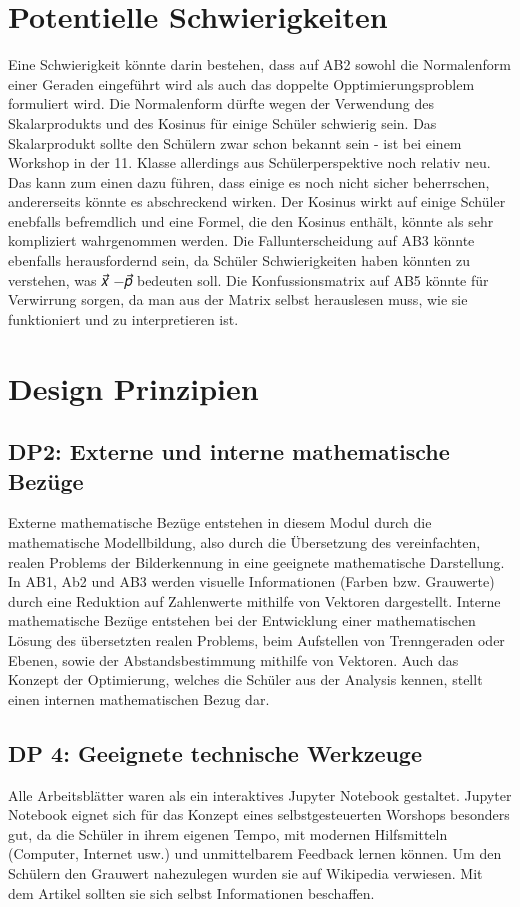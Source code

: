     \section{Potentielle Schwierigkeiten}
    Eine Schwierigkeit könnte darin bestehen, dass auf AB2 sowohl die Normalenform einer Geraden eingeführt wird als auch das doppelte Opptimierungsproblem formuliert wird. Die Normalenform dürfte wegen der Verwendung des Skalarprodukts und des Kosinus für einige Schüler schwierig sein. Das Skalarprodukt sollte den Schülern zwar schon bekannt sein - ist bei einem Workshop in der 11. Klasse allerdings aus Schülerperspektive noch relativ neu. Das kann zum einen dazu führen, dass einige es noch nicht sicher beherrschen, andererseits könnte es abschreckend wirken. Der Kosinus wirkt auf einige Schüler enebfalls befremdlich und eine Formel, die den Kosinus enthält, könnte als sehr kompliziert wahrgenommen werden.
    Die Fallunterscheidung auf AB3 könnte ebenfalls herausfordernd sein, da Schüler Schwierigkeiten haben könnten zu verstehen, was 𝑥⃗ −𝑝⃗ bedeuten soll.
    Die Konfussionsmatrix auf AB5 könnte für Verwirrung sorgen, da man aus der Matrix selbst herauslesen muss, wie sie funktioniert und zu interpretieren ist.
    
    \section{Design Prinzipien}
       \subsection{DP2: Externe und interne mathematische Bezüge}
            Externe mathematische Bezüge entstehen in diesem Modul durch die mathematische Modellbildung, also durch die Übersetzung des vereinfachten, realen Problems der Bilderkennung in eine geeignete mathematische Darstellung.
            In AB1, Ab2 und AB3 werden visuelle Informationen (Farben bzw. Grauwerte) durch eine Reduktion auf Zahlenwerte mithilfe von Vektoren dargestellt.
            Interne mathematische Bezüge entstehen bei der Entwicklung einer mathematischen Lösung des übersetzten realen Problems, beim Aufstellen von Trenngeraden oder Ebenen, sowie der Abstandsbestimmung mithilfe von Vektoren.
            Auch das Konzept der Optimierung, welches die Schüler aus der Analysis kennen, stellt einen internen mathematischen Bezug dar.
        \subsection{DP 4: Geeignete technische Werkzeuge}
            Alle Arbeitsblätter waren als ein interaktives Jupyter Notebook gestaltet. Jupyter Notebook eignet sich für das Konzept eines selbstgesteuerten Worshops besonders gut, da die Schüler in ihrem eigenen Tempo, mit modernen Hilfsmitteln (Computer, Internet usw.) und unmittelbarem Feedback lernen können. Um den Schülern den Grauwert nahezulegen wurden sie auf Wikipedia verwiesen. Mit dem Artikel sollten sie sich selbst Informationen beschaffen.
